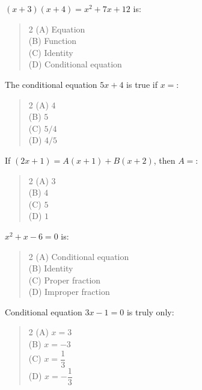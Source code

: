\documentclass[11pt,a4paper]{article}
\begin{document}
\begin{mcqlist}
\item $(x+3)(x+4)=x^2+7x+12$ is:
\begin{quote}\begin{multicols}{2}
\noindent (A) Equation \\
(B) Function \\
(C) Identity \\
(D) Conditional equation
\end{multicols}\end{quote}

\item The conditional equation $5x+4$ is true if $x=$:
\begin{quote}\begin{multicols}{2}
\noindent (A) $4$ \\
(B) $5$ \\
(C) $5/4$ \\
(D) $4/5$
\end{multicols}\end{quote}

\item If $(2x+1)=A(x+1)+B(x+2)$, then $A=$:
\begin{quote}\begin{multicols}{2}
\noindent (A) $3$ \\
(B) $4$ \\
(C) $5$ \\
(D) $1$
\end{multicols}\end{quote}

\item $x^2+x-6=0$ is:
\begin{quote}\begin{multicols}{2}
\noindent (A) Conditional equation \\
(B) Identity \\
(C) Proper fraction \\
(D) Improper fraction
\end{multicols}\end{quote}

\item Conditional equation $3x-1=0$ is truly only:
\begin{quote}\begin{multicols}{2}
\noindent (A) $x=3$ \\
(B) $x=-3$ \\
(C) $x=\dfrac{1}{3}$ \\
(D) $x=-\dfrac{1}{3}$
\end{multicols}\end{quote}


\end{mcqlist}
\end{document}
